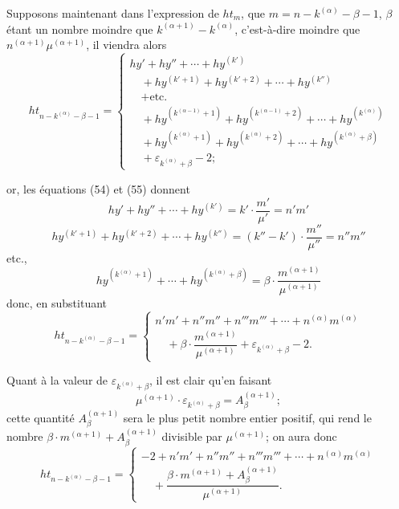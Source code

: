 \documentclass{article}
\begin{document}
Supposons maintenant dans l'expression de $ht_m$, que $m = n - k^{(\alpha)} - \beta - 1$, $\beta$ étant un nombre moindre que $k^{(\alpha+1)} - k^{(\alpha)}$, c'est-à-dire moindre que $n^{(\alpha+1)}\mu^{(\alpha+1)}$, il viendra alors
\[ ht_{n-k^{(\alpha)}-\beta-1} = \begin{cases}
hy' + hy'' + \cdots + hy^{(k')} \\
\quad + hy^{(k'+1)} + hy^{(k'+2)} + \cdots + hy^{(k'')} \\
\quad + \text{etc.} \\
\quad + hy^{(k^{(\alpha-1)}+1)} + hy^{(k^{(\alpha-1)}+2)} + \cdots + hy^{(k^{(\alpha)})} \\
\quad + hy^{(k^{(\alpha)}+1)} + hy^{(k^{(\alpha)}+2)} + \cdots + hy^{(k^{(\alpha)}+\beta)} \\
\quad + \varepsilon_{k^{(\alpha)}+\beta} - 2;
\end{cases} \]

or, les équations (54) et (55) donnent
\[ hy' + hy'' + \cdots + hy^{(k')} = k' \cdot \frac{m'}{\mu'} = n'm' \]
\[ hy^{(k'+1)} + hy^{(k'+2)} + \cdots + hy^{(k'')} = (k''-k') \cdot \frac{m''}{\mu''} = n''m'' \]
etc.,
\[ hy^{(k^{(\alpha)}+1)} + \cdots + hy^{(k^{(\alpha)}+\beta)} = \beta \cdot \frac{m^{(\alpha+1)}}{\mu^{(\alpha+1)}} \]
donc, en substituant
\[ ht_{n-k^{(\alpha)}-\beta-1} = \begin{cases} n'm' + n''m'' + n'''m''' + \cdots + n^{(\alpha)}m^{(\alpha)} \\ \quad + \beta \cdot \dfrac{m^{(\alpha+1)}}{\mu^{(\alpha+1)}} + \varepsilon_{k^{(\alpha)}+\beta} - 2. \end{cases} \tag{56} \]

Quant à la valeur de $\varepsilon_{k^{(\alpha)}+\beta}$, il est clair qu'en faisant
\[ \mu^{(\alpha+1)} \cdot \varepsilon_{k^{(\alpha)}+\beta} = A_\beta^{(\alpha+1)}; \]
cette quantité $A_\beta^{(\alpha+1)}$ sera le plus petit nombre entier positif, qui rend le nombre $\beta \cdot m^{(\alpha+1)} + A_\beta^{(\alpha+1)}$ divisible par $\mu^{(\alpha+1)}$; on aura donc
\[ ht_{n-k^{(\alpha)}-\beta-1} = \begin{cases} -2 + n'm' + n''m'' + n'''m''' + \cdots + n^{(\alpha)}m^{(\alpha)} \\ \quad + \dfrac{\beta \cdot m^{(\alpha+1)} + A_\beta^{(\alpha+1)}}{\mu^{(\alpha+1)}}. \end{cases} \tag{57} \]
\end{document}
